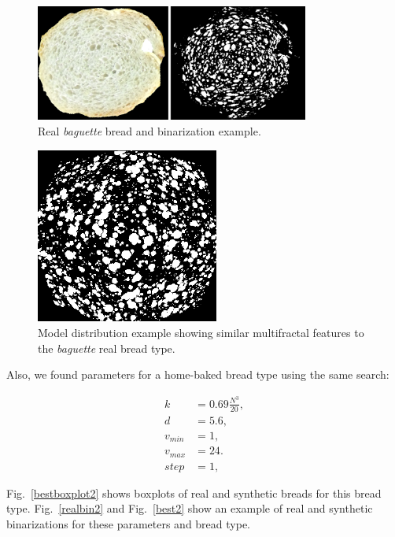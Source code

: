 \documentclass[spanish,a4paper,11pt,oneside,links]{report}
\begin{document}
\begin{figure}[!ht]
\begin{center}
\includegraphics[width=9cm]{figures/realbin}
\caption{ Real {\em baguette} bread and binarization example.}
\label{realbin}
\end{center}
\end{figure}

\begin{figure}[!ht]
\begin{center}
\includegraphics[width=6cm]{figures/best}
\caption{Model distribution example showing similar multifractal features to the {\em baguette} real bread type.}
\label{best}
\end{center}
\end{figure}

Also, we found parameters for a home-baked bread type using the same search:

\begin{align*}
k &= 0.69 \frac{N^{3}}{20} ,\\
d &=5.6,\\
v_{min} &=1,\\
v_{max} &=24.\\
step &=1,
\end{align*}

Fig.~\ref{bestboxplot2} shows boxplots of real and synthetic breads for this bread type. Fig.~\ref{realbin2} and  Fig.~\ref{best2} show an example of real and synthetic binarizations for these parameters and bread type. 
\end{document}
